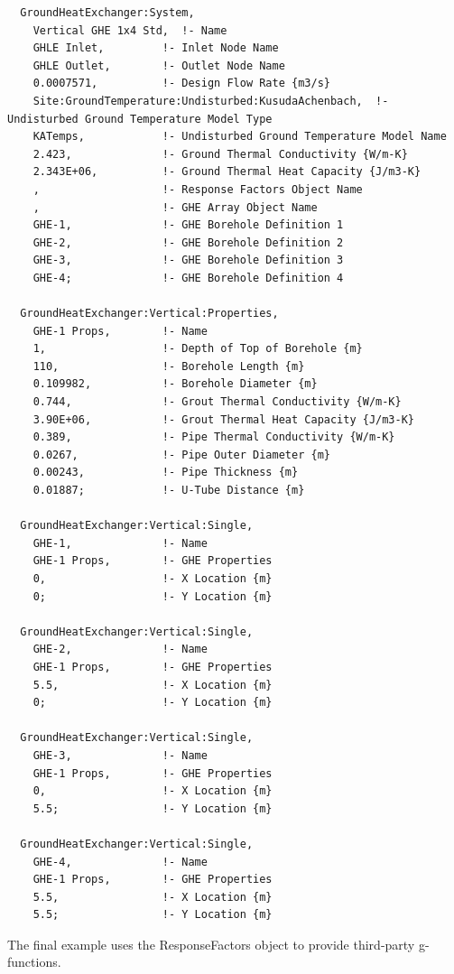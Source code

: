 \begin{lstlisting}
  GroundHeatExchanger:System,
    Vertical GHE 1x4 Std,  !- Name
    GHLE Inlet,         !- Inlet Node Name
    GHLE Outlet,        !- Outlet Node Name
    0.0007571,          !- Design Flow Rate {m3/s}
    Site:GroundTemperature:Undisturbed:KusudaAchenbach,  !- Undisturbed Ground Temperature Model Type
    KATemps,            !- Undisturbed Ground Temperature Model Name
    2.423,              !- Ground Thermal Conductivity {W/m-K}
    2.343E+06,          !- Ground Thermal Heat Capacity {J/m3-K}
    ,                   !- Response Factors Object Name
    ,                   !- GHE Array Object Name
    GHE-1,              !- GHE Borehole Definition 1
    GHE-2,              !- GHE Borehole Definition 2
    GHE-3,              !- GHE Borehole Definition 3
    GHE-4;              !- GHE Borehole Definition 4

  GroundHeatExchanger:Vertical:Properties,
    GHE-1 Props,        !- Name
    1,                  !- Depth of Top of Borehole {m}
    110,                !- Borehole Length {m}
    0.109982,           !- Borehole Diameter {m}
    0.744,              !- Grout Thermal Conductivity {W/m-K}
    3.90E+06,           !- Grout Thermal Heat Capacity {J/m3-K}
    0.389,              !- Pipe Thermal Conductivity {W/m-K}
    0.0267,             !- Pipe Outer Diameter {m}
    0.00243,            !- Pipe Thickness {m}
    0.01887;            !- U-Tube Distance {m}

  GroundHeatExchanger:Vertical:Single,
    GHE-1,              !- Name
    GHE-1 Props,        !- GHE Properties
    0,                  !- X Location {m}
    0;                  !- Y Location {m}

  GroundHeatExchanger:Vertical:Single,
    GHE-2,              !- Name
    GHE-1 Props,        !- GHE Properties
    5.5,                !- X Location {m}
    0;                  !- Y Location {m}

  GroundHeatExchanger:Vertical:Single,
    GHE-3,              !- Name
    GHE-1 Props,        !- GHE Properties
    0,                  !- X Location {m}
    5.5;                !- Y Location {m}

  GroundHeatExchanger:Vertical:Single,
    GHE-4,              !- Name
    GHE-1 Props,        !- GHE Properties
    5.5,                !- X Location {m}
    5.5;                !- Y Location {m}
\end{lstlisting}

The final example uses the ResponseFactors object to provide third-party g-functions.

